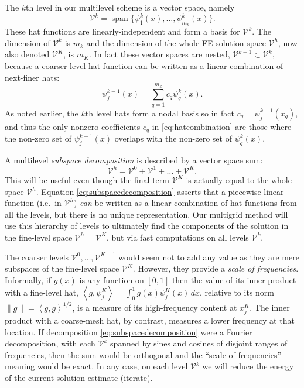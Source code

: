\documentclass[letterpaper,final,12pt,reqno]{amsart}
\newcommand{\ip}[2]{\left<#1,#2\right>}
\begin{document}
The $k$th level in our multilevel scheme is a vector space, namely
\begin{equation}
  \mathcal{V}^k = \operatorname{span}\{\psi_1^k(x),\dots,\psi_{m_k}^k(x)\}.  \label{eq:definevk}
\end{equation}
These hat functions are linearly-independent and form a basis for $\mathcal{V}^k$.  The dimension of $\mathcal{V}^k$ is $m_k$ and the dimension of the whole FE solution space $\mathcal{V}^h$, now also denoted $\mathcal{V}^K$, is $m_K$.  In fact these vector spaces are nested, $\mathcal{V}^{k-1} \subset \mathcal{V}^k$, because a coarser-level hat function can be written as a linear combination of next-finer hats:
\begin{equation}
   \psi_j^{k-1}(x) = \sum_{q=1}^{m_k} c_q \psi_q^k(x). \label{eq:hatcombination}
\end{equation}
As noted earlier, the $k$th level hats form a nodal basis so in fact $c_q = \psi_j^{k-1}(x_q)$, and thus the only nonzero coefficients $c_q$ in \eqref{eq:hatcombination} are those where the non-zero set of $\psi_j^{k-1}(x)$ overlaps with the non-zero set of $\psi_q^k(x)$.

A multilevel \emph{subspace decomposition} is described by a vector space sum:
\begin{equation}
  \mathcal{V}^h = \mathcal{V}^0 + \mathcal{V}^1 + \dots + \mathcal{V}^K. \label{eq:subspacedecomposition}
\end{equation}
This will be useful even though the final term $\mathcal{V}^K$ is actually equal to the whole space $\mathcal{V}^h$.  Equation \eqref{eq:subspacedecomposition} asserts that a piecewise-linear function (i.e.~in $\mathcal{V}^h$) \emph{can} be written as a linear combination of hat functions from all the levels, but there is no unique representation.  Our multigrid method will use this hierarchy of levels to ultimately find the components of the solution in the fine-level space $\mathcal{V}^h=\mathcal{V}^K$, but via fast computations on all levels $\mathcal{V}^k$.

The coarser levels $\mathcal{V}^0,\dots,\mathcal{V}^{K-1}$ would seem not to add any value as they are mere subspaces of the fine-level space $\mathcal{V}^K$.  However, they provide a \emph{scale of frequencies}.  Informally, if $g(x)$ is any function on $[0,1]$ then the value of its inner product with a fine-level hat, $\ip{g}{\psi_j^K} = \int_0^1 g(x) \psi_j^K(x)\,dx$, relative to its norm $\|g\| = \ip{g}{g}^{1/2}$, is a measure of its high-frequency content at $x_j^K$.  The inner product with a coarse-mesh hat, by contrast, measures a lower frequency at that location.  If decomposition \eqref{eq:subspacedecomposition} were a Fourier decomposition, with each $\mathcal{V}^k$ spanned by sines and cosines of disjoint ranges of frequencies, then the sum would be orthogonal and the ``scale of frequencies'' meaning would be exact.  In any case, on each level $\mathcal{V}^k$ we will reduce the energy of the current solution estimate (iterate).
\end{document}

